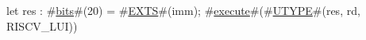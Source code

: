 let res : #\hyperref[sailRISCVzbits]{bits}#(20) = #\hyperref[sailRISCVzEXTS]{EXTS}#(imm);
#\hyperref[sailRISCVzexecute]{execute}#(#\hyperref[sailRISCVzUTYPE]{UTYPE}#(res, rd, RISCV_LUI))
